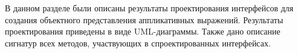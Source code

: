 В данном разделе были описаны результаты проектирования интерфейсов для создания
объектного представления аппликативных выражений. Результаты проектирования
приведены в виде UML-диаграммы. Также дано описание сигнатур всех методов, участвующих в
спроектированных интерфейсах.

